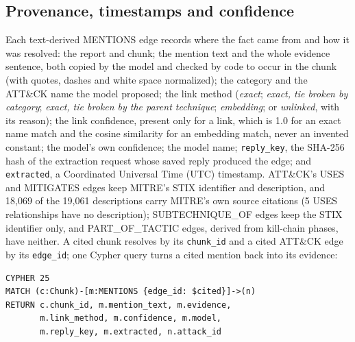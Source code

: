 \documentclass[conference,letterpaper]{IEEEtran}
\newcommand{\code}[1]{\texttt{#1}}
\begin{document}
\subsection{Provenance, timestamps and confidence}
Each text-derived MENTIONS edge records where the fact came from and how it was resolved: the report and chunk; the mention text and the whole evidence sentence, both copied by the model and checked by code to occur in the chunk (with quotes, dashes and white space normalized); the category and the ATT\&CK name the model proposed; the link method (\emph{exact}; \emph{exact, tie broken by category}; \emph{exact, tie broken by the parent technique}; \emph{embedding}; or \emph{unlinked}, with its reason); the link confidence, present only for a link, which is 1.0 for an exact name match and the cosine similarity for an embedding match, never an invented constant; the model's own confidence; the model name; \code{reply\_key}, the \mbox{SHA-256} hash of the extraction request whose saved reply produced the edge; and \code{extracted}, a Coordinated Universal Time (UTC) timestamp. ATT\&CK's USES and MITIGATES edges keep MITRE's STIX identifier and description, and 18,069 of the 19,061 descriptions carry MITRE's own source citations (5 USES relationships have no description); SUBTECHNIQUE\_OF edges keep the STIX identifier only, and PART\_OF\_TACTIC edges, derived from kill-chain phases, have neither. A cited chunk resolves by its \code{chunk\_id} and a cited ATT\&CK edge by its \code{edge\_id}; one Cypher query turns a cited mention back into its evidence:
\begin{lstlisting}
CYPHER 25
MATCH (c:Chunk)-[m:MENTIONS {edge_id: $cited}]->(n)
RETURN c.chunk_id, m.mention_text, m.evidence,
       m.link_method, m.confidence, m.model,
       m.reply_key, m.extracted, n.attack_id
\end{lstlisting}
\end{document}
